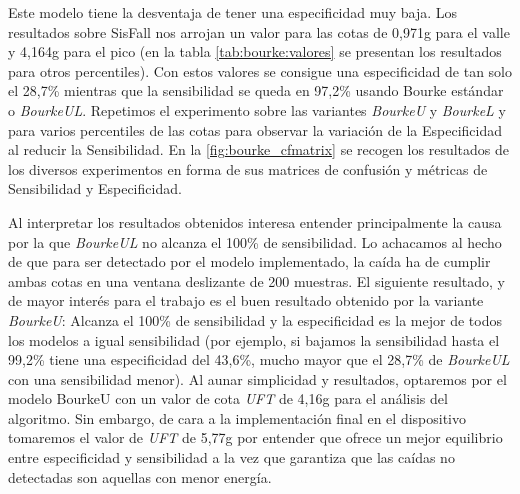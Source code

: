 
  Este modelo tiene la desventaja de tener una especificidad muy baja. Los resultados sobre SisFall nos arrojan un valor para las cotas de 0,971g para el valle y 4,164g para el pico (en la tabla \ref{tab:bourke:valores} se presentan los resultados para otros percentiles). Con estos valores se consigue una especificidad de tan solo el 28,7\% mientras que la sensibilidad se queda en 97,2\% usando Bourke estándar o \textit{BourkeUL}. Repetimos el experimento sobre las variantes \textit{BourkeU} y \textit{BourkeL} y para varios percentiles de las cotas para observar la variación de la Especificidad al reducir la Sensibilidad. En la \autoref{fig:bourke_cfmatrix} se recogen los resultados de los diversos experimentos en forma de sus matrices de confusión y métricas de Sensibilidad y Especificidad.  


Al interpretar los resultados obtenidos interesa entender principalmente la causa por la que \textit{BourkeUL} no alcanza el 100\% de sensibilidad. Lo achacamos al hecho de que para ser detectado por el modelo implementado, la caída ha de cumplir ambas cotas en una ventana deslizante de 200 muestras. El siguiente resultado, y de mayor interés para el trabajo es el buen resultado obtenido por la variante \textit{BourkeU}: Alcanza el 100\% de sensibilidad y la especificidad es la mejor de todos los modelos a igual sensibilidad (por ejemplo, si bajamos la sensibilidad hasta el 99,2\% tiene una especificidad del 43,6\%, mucho mayor que el 28,7\% de \textit{BourkeUL} con una sensibilidad menor). Al aunar simplicidad y resultados, optaremos por el modelo BourkeU con un valor de cota \textit{UFT} de 4,16g para el análisis del algoritmo. Sin embargo, de cara a la implementación final en el dispositivo tomaremos el valor de \textit{UFT} de 5,77g por entender que ofrece un mejor equilibrio entre especificidad y sensibilidad a la vez que garantiza que las caídas no detectadas son aquellas con menor energía.


